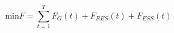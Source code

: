 \begin{equation} \label{eq:ded-problem}
	\text{min} F = \sum^T_{t=1}{F_G(t) + F_{RES}(t) + F_{ESS}(t)}
\end{equation} 


\begin{comment}
	
	* Define Constratins:
	* Power Balance
	* Conventional Generation
	* ESS Constraint
	
	* Real Power Balance Constraint
	* Real Power Operating Limits
	* Generation Unit Ramp rate Limits
	
	* Branch Flow Constraints
	* Voltage Constraints
	* RES Power Output Constraints
	
	* Define Graph
	Other considerations?
	
\end{comment}